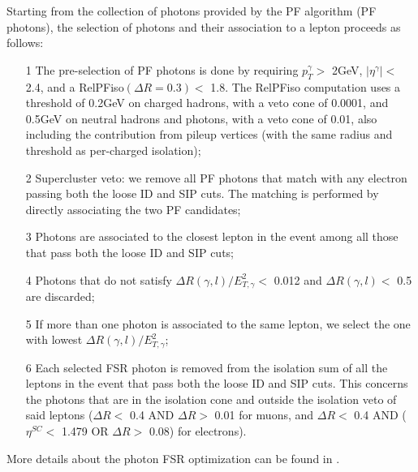 Starting from the collection of photons provided by the PF algorithm (PF photons), the selection of photons and their association to a lepton proceeds as follows:
\begin{itemize}
	\item[1] The pre-selection of PF photons is done by requiring $p_{T}^{\gamma}>$ 2GeV, $|\eta^{\gamma}|<$ 2.4, and a RelPFiso$(\Delta R=0.3)<$ 1.8. The RelPFiso computation uses a threshold of 0.2GeV on charged hadrons, with a veto cone of 0.0001, and 0.5GeV on neutral hadrons and photons, with a veto cone of 0.01, also including the contribution from pileup vertices (with the same radius and threshold as per-charged isolation);
	\item[2] Supercluster veto: we remove all PF photons that match with any electron passing both the loose ID and SIP cuts. The matching is performed by directly associating the two PF candidates;
	\item[3] Photons are associated to the closest lepton in the event among all those that pass both the loose ID and SIP cuts;
	\item[4] Photons that do not satisfy $\Delta R(\gamma,l)/E_{T,\gamma}^{2}<$ 0.012 and $\Delta R(\gamma,l)<$ 0.5 are discarded;
	\item[5] If more than one photon is associated to the same lepton, we select the one with lowest $\Delta R(\gamma,l)/E_{T,\gamma}^{2}$;
	\item[6] Each selected FSR photon is removed from the isolation sum of all the leptons in the event that pass both the loose ID and SIP cuts. This concerns the photons that are in the isolation cone and outside the isolation veto of said leptons ($\Delta R<$ 0.4 AND $\Delta R>$ 0.01 for muons, and $\Delta R<$ 0.4 AND ($\eta^{SC}<$ 1.479 OR $\Delta R>$ 0.08) for electrons).
\end{itemize}

More details about the photon FSR optimization can be found in \cite{bib:CMS-AN-15-277,bib:CMS-AN-16-442}.


